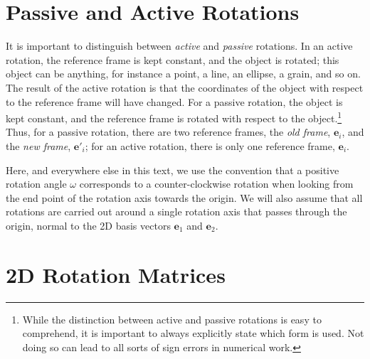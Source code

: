 \section{Passive and Active Rotations\label{ssec:passiveactive}}
It is important to distinguish between \textit{active} and \textit{passive} rotations. In an active rotation, the reference frame is kept constant, and the object is rotated; this object can be anything, for instance a point, a line, an ellipse, a grain, and so on.  The result of the active rotation is that the coordinates of the object with respect to the reference frame will have changed.  For a passive rotation, the object is kept constant, and the reference frame is rotated with respect to the object.\footnote{While the distinction between active and passive rotations is easy to comprehend, it is important to always explicitly state which form is used.  Not doing so can lead to all sorts of sign errors in numerical work.}  Thus, for a passive rotation, there are two reference frames, the \textit{old frame}, $\mathbf{e}_i$, and the \textit{new frame}, $\mathbf{e}'_i$; for an active rotation, there is only one reference frame, $\mathbf{e}_i$.

Here, and everywhere else in this text, we use the convention that a positive rotation angle $\omega$ corresponds to a counter-clockwise rotation when looking from the end point of the rotation axis towards the origin.  We will also assume that all rotations are carried out around a single rotation axis that passes through the origin, normal to the 2D basis vectors $\mathbf{e}_1$ and $\mathbf{e}_2$.


\section{2D Rotation Matrices\label{ssec:2DRM}}
